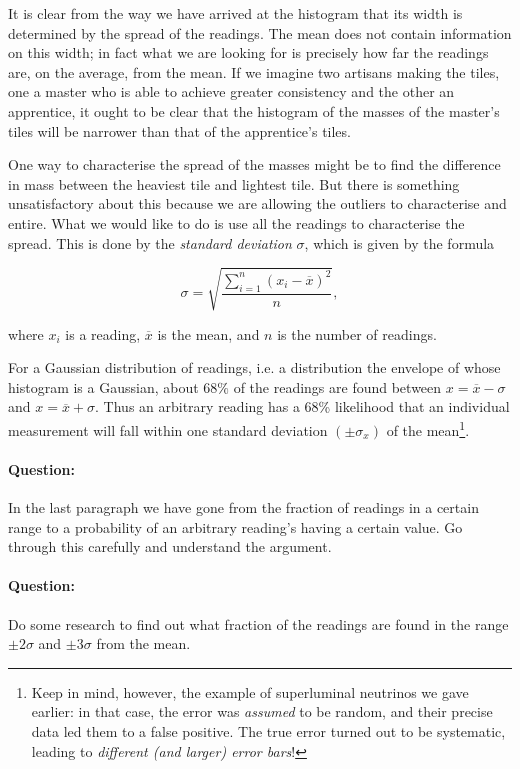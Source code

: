 It is clear from the way we have arrived at the histogram that its width is determined by the spread of the readings. The mean does not contain information on this width; in fact what we are looking for is precisely how far the readings are, on the average, from the mean. If we imagine two artisans making the tiles, one a master who is able to achieve greater consistency and the other an apprentice, it ought to be clear that the histogram of the masses of the master's tiles will be narrower than that of the apprentice's tiles.

One way to characterise the spread of the masses might be to find the difference in mass between the heaviest tile and lightest tile. But there is something unsatisfactory about this because we are allowing the outliers to characterise and entire. What we would like to do is use all the readings to characterise the spread. This is done by the \textit{standard deviation} $\sigma$, which is given by the formula

\begin{equation}
    \sigma = \sqrt{\frac{\sum_{i=1}^{n} (x_i - \overline{x})^2}{n}},
\end{equation}

where $x_i$ is a reading, $\overline{x}$ is the mean, and $n$ is the number of readings.

For a Gaussian distribution of readings, i.e. a distribution the envelope of whose histogram is a Gaussian, about $68 \%$ of the readings are found between $x = \overline{x} - \sigma$ and $x = \overline{x} + \sigma$. Thus an arbitrary reading has a 68\% likelihood that an individual measurement will fall within one standard deviation $(\pm\sigma_x)$ of the mean\footnote{Keep in mind, however, the example of superluminal neutrinos we gave earlier: in that case, the error was \textit{assumed} to be random, and their precise data led them to a false positive. The true error turned out to be systematic, leading to \textit{different (and larger) error bars}!}. 


\begin{question}
    \paragraph{Question:} In the last paragraph we have gone from the fraction of readings in a certain range to a probability of an arbitrary reading's having a certain value. Go through this carefully and understand the argument.

    \paragraph{Question:} Do some research to find out what fraction of the readings are found in the range $\pm 2\sigma$ and $\pm 3 \sigma$ from the mean. 
\end{question}

